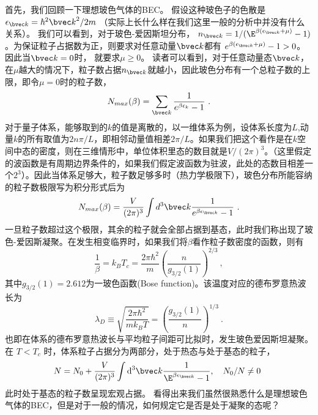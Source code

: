 
首先，我们回顾一下理想玻色气体的BEC。 假设这种玻色子的色散是 $\epsilon_{\bvec k} = \hbar^2{\bvec k}^2/2m$ （实际上长什么样在我们这里一般的分析中并没有什么关系）。 我们可以看到，对于玻色-爱因斯坦分布， $n_{\bvec k}=1/(\E^{\beta(\epsilon_{\bvec k}+\mu)}-1)$。为保证粒子占据数为正，则要求对任意动量$\bvec k$都有 $e^{\beta (\epsilon_{\bvec k}+\mu)}-1>0$。 因此当$\bvec k = 0$时， 就要求$\mu \geq 0$。 读者可以看到，对于任意动量态$\bvec k$，在$\mu$越大的情况下，粒子数占据$n_{\bvec k}$就越小，因此玻色分布有一个总粒子数的上限，即令$\mu = 0$时的粒子数，
\begin{equation}
N_{max}(\beta) = \sum_{\bvec k} \frac{1}{e^{\beta \epsilon_k}-1}~.
\end{equation}
对于量子体系，能够取到的$k$的值是离散的，以一维体系为例，设体系长度为$L$,动量$k$的所有取值为$2 n\pi/L$，即相邻动量值相差$2\pi/L$。如果我们把这个看作是在$k$空间中态的密度，则在三维情形中，单位体积里态的数目就是$V/(2 \pi)^3$。（这里假定的波函数是有周期边界条件的，如果我们假定波函数为驻波，此处的态数目相差一个$2^3$）。因此当体系足够大，粒子数足够多时（热力学极限下），玻色分布所能容纳的粒子数极限写为积分形式后为
\begin{equation}
N_{max}(\beta) = \frac{V}{(2\pi)^3}\int d^3 \bvec k \frac{1}{e^{\beta \epsilon_{\bvec k}}-1}~.
\end{equation}
一旦粒子数超过这个极限，其余的粒子就会全部占据到基态，此时我们称出现了玻色-爱因斯凝聚。在发生相变临界时，如果我们将$\beta$看作粒子数密度的函数，则有
\begin{equation}
\frac{1}{\beta} = k_B T_c = \frac{2\pi \hbar^2}{m}(\frac{n}{g_{3/2}(1)})^{2/3}~,
\end{equation}
其中$g_{3/2}(1) = 2.612$为一玻色函数(Bose function)。该温度对应的德布罗意热波长为
\begin{equation}
\lambda_D \equiv \sqrt{\frac{2\pi \hbar^2}{m k_B T}} = (\frac{g_{3/2}(1)}{n})^{1/3}~.
\end{equation}
也即在体系的德布罗意热波长与平均粒子间距可比拟时，发生玻色爱因斯坦凝聚。 在 $T<T_c$ 时，体系粒子占据分为两部分，处于热态与处于基态的粒子，
\begin{equation}
N=N_0+\frac{V}{(2\pi)^3}\int \text{d}^3{\bvec k}\frac{1}{\E^{\beta\epsilon_{\bvec k}}-1},\quad N_0/N\neq0~
\end{equation}
此时处于基态的粒子数呈现宏观占据。 看得出来我们虽然很熟悉什么是理想玻色气体的BEC，但是对于一般的情况，如何规定它是否是处于凝聚的态呢？

